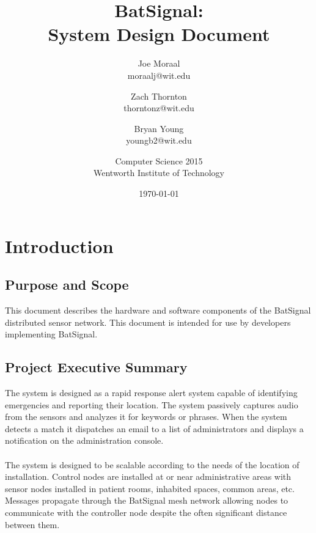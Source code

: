 \documentclass[11pt,a4paper]{article}
\begin{document}
\title{BatSignal:\\System Design Document}
\author{
	Joe Moraal\\moraalj@wit.edu\\ \and
	Zach Thornton\\thorntonz@wit.edu \and
    Bryan Young\\youngb2@wit.edu \and
	Computer Science 2015 \\
	Wentworth Institute of Technology
}
\date{\today}

\maketitle
\newpage

\tableofcontents{}
\newpage


\section{Introduction}

\subsection{Purpose and Scope}
This document describes the hardware and software components of the BatSignal distributed sensor network. This document is intended for use by developers implementing BatSignal.

\subsection{Project Executive Summary}
The system is designed as a rapid response alert system capable of identifying emergencies and reporting their location. The system passively captures audio from the sensors and analyzes it for keywords or phrases. When the system detects a match it dispatches an email to a list of administrators and displays a notification on the administration console. \\\\
The system is designed to be scalable according to the needs of the location of installation. Control nodes are installed at or near administrative areas with sensor nodes installed in patient rooms, inhabited spaces, common areas, etc. Messages propagate through the BatSignal mesh network allowing nodes to communicate with the controller node despite the often significant distance between them.
\end{document}

